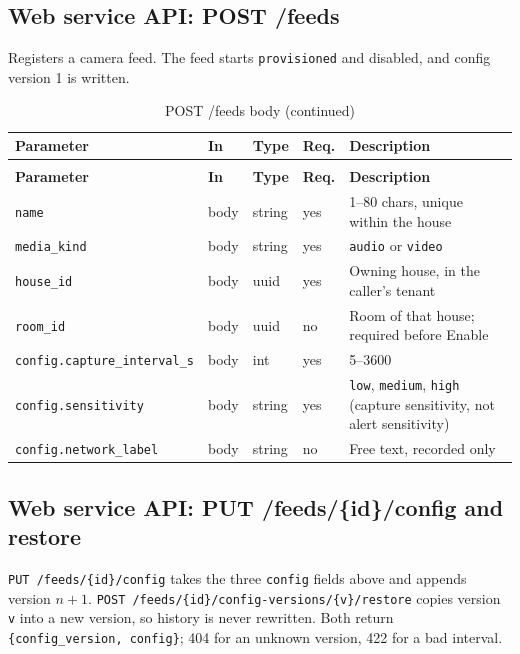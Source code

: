\subsection{Web service API: POST /feeds}
Registers a camera feed. The feed starts \texttt{provisioned} and disabled, and config version 1 is written.
\begin{longtable}{L{2.8cm}L{1.4cm}L{1.6cm}L{1.1cm}L{7.0cm}}
\caption{POST /feeds body}\\
\toprule
\textbf{Parameter} & \textbf{In} & \textbf{Type} & \textbf{Req.} & \textbf{Description} \\
\midrule
\endfirsthead
\caption[]{POST /feeds body (continued)}\\
\toprule
\textbf{Parameter} & \textbf{In} & \textbf{Type} & \textbf{Req.} & \textbf{Description} \\
\midrule
\endhead
\texttt{name} & body & string & yes & 1--80 chars, unique within the house \\
\texttt{media\_kind} & body & string & yes & \texttt{audio} or \texttt{video} \\
\texttt{house\_id} & body & uuid & yes & Owning house, in the caller's tenant \\
\texttt{room\_id} & body & uuid & no & Room of that house; required before Enable \\
\texttt{config.capture\_interval\_s} & body & int & yes & 5--3600 \\
\texttt{config.sensitivity} & body & string & yes & \texttt{low}, \texttt{medium}, \texttt{high} (capture sensitivity, not alert sensitivity) \\
\texttt{config.network\_label} & body & string & no & Free text, recorded only \\
\bottomrule
\end{longtable}

\subsection{Web service API: PUT /feeds/\{id\}/config and restore}
\texttt{PUT /feeds/\{id\}/config} takes the three \texttt{config} fields above and appends version $n+1$.
\texttt{POST /feeds/\{id\}/config-versions/\{v\}/restore} copies version \texttt{v} into a new version, so history
is never rewritten. Both return \texttt{\{config\_version, config\}}; 404 for an unknown version, 422 for a bad interval.

